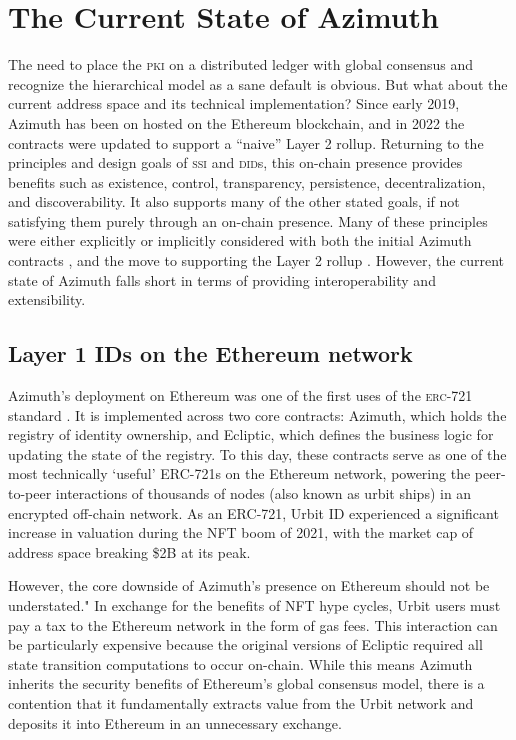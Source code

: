 \documentclass[twoside]{article}
\begin{document}
\section{The Current State of Azimuth}

The need to place the \textsc{pki} on a distributed ledger with global consensus and recognize the hierarchical model as a sane default is obvious. But what about the current address space and its technical implementation? Since early 2019, Azimuth has been on hosted on the Ethereum blockchain, and in 2022 the contracts were updated to support a ``naive'' Layer 2 rollup. Returning to the principles and design goals of \textsc{ssi} and \textsc{did}s, this on-chain presence provides benefits such as existence, control, transparency, persistence, decentralization, and discoverability. It also supports many of the other stated goals, if not satisfying them purely through an on-chain presence. Many of these principles were either explicitly or implicitly considered with both the initial Azimuth contracts \citep{WolfePaul2019}, and the move to supporting the Layer 2 rollup \citep{Paprocki2021}. However, the current state of Azimuth falls short in terms of providing interoperability and extensibility.

\subsection{Layer 1 IDs on the Ethereum network}

Azimuth's deployment on Ethereum was one of the first uses of the \textsc{erc}-721 standard \citep{ERC721}. It is implemented across two core contracts: Azimuth, which holds the registry of identity ownership, and Ecliptic, which defines the business logic for updating the state of the registry. To this day, these contracts serve as one of the most technically `useful' ERC-721s on the Ethereum network, powering the peer-to-peer interactions of thousands of nodes (also known as urbit ships) in an encrypted off-chain network. As an ERC-721, Urbit ID experienced a significant increase in valuation during the NFT boom of 2021, with the market cap of address space breaking \$2B at its peak.

However, the core downside of Azimuth's presence on Ethereum should not be understated." In exchange for the benefits of NFT hype cycles, Urbit users must pay a tax to the Ethereum network in the form of gas fees. This interaction can be particularly expensive because the original versions of Ecliptic required all state transition computations to occur on-chain. While this means Azimuth inherits the security benefits of Ethereum's global consensus model, there is a contention that it fundamentally extracts value from the Urbit network and deposits it into Ethereum in an unnecessary exchange.
\end{document}

